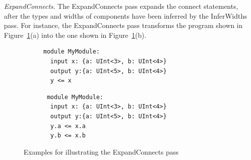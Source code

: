 
\smallskip
\noindent\emph{ExpandConnects.} The ExpandConnects pass expands the connect statements,
after the types and widths of components have been inferred by the InferWidths pass.
For instance, the ExpandConnects pass transforms the program shown in Figure~\ref{fig-lofirrtl-exmp2}(a) into the one shown in Figure~\ref{fig-lofirrtl-exmp2}(b).


\begin{figure}[h]
\vspace{-2mm}
\centering
\begin{subfigure}[b]{0.47\textwidth}
         \centering
\begin{lstlisting}[boxpos=t,aboveskip=0pt]
module MyModule:
  input x: {a: UInt<3>, b: UInt<4>}
  output y:{a: UInt<5>, b: UInt<4>}
  y <= x
\end{lstlisting}
\vspace*{0.92\baselineskip}
\caption{}
\end{subfigure}
\hspace{4mm}
\begin{subfigure}[b]{0.47\textwidth}
         \centering
\begin{lstlisting}
 module MyModule:
  input x: {a: UInt<3>, b: UInt<4>}
  output y:{a: UInt<5>, b: UInt<4>}
  y.a <= x.a
  y.b <= x.b
\end{lstlisting}
\caption{}
\end{subfigure}
\vspace{-2mm}
\caption{Examples for illustrating the ExpandConnects pass}
\label{fig-lofirrtl-exmp2}
\vspace{-3mm}
\end{figure}

